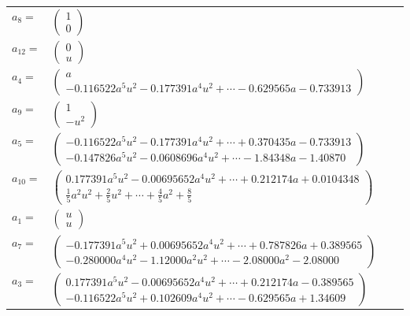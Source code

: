 \documentclass[1p]{elsarticle_modified}
\theoremstyle{definition}
\begin{document}
\begin{tabular}{m{7pt} m{180pt} m{7pt} m{180pt} }
\flushright $a_{8}=$&$\begin{pmatrix}1\\0\end{pmatrix}$ \\
\flushright $a_{12}=$&$\begin{pmatrix}0\\u\end{pmatrix}$ \\
\flushright $a_{4}=$&$\begin{pmatrix}a\\-0.116522 a^{5} u^{2}-0.177391 a^{4} u^{2}+\cdots-0.629565 a-0.733913\end{pmatrix}$ \\
\flushright $a_{9}=$&$\begin{pmatrix}1\\- u^2\end{pmatrix}$ \\
\flushright $a_{5}=$&$\begin{pmatrix}-0.116522 a^{5} u^{2}-0.177391 a^{4} u^{2}+\cdots+0.370435 a-0.733913\\-0.147826 a^{5} u^{2}-0.0608696 a^{4} u^{2}+\cdots-1.84348 a-1.40870\end{pmatrix}$ \\
\flushright $a_{10}=$&$\begin{pmatrix}0.177391 a^{5} u^{2}-0.00695652 a^{4} u^{2}+\cdots+0.212174 a+0.0104348\\\frac{1}{5} a^2 u^2+\frac{2}{5} u^2+\cdots+\frac{4}{5} a^2+\frac{8}{5}\end{pmatrix}$ \\
\flushright $a_{1}=$&$\begin{pmatrix}u\\u\end{pmatrix}$ \\
\flushright $a_{7}=$&$\begin{pmatrix}-0.177391 a^{5} u^{2}+0.00695652 a^{4} u^{2}+\cdots+0.787826 a+0.389565\\-0.280000 a^{4} u^{2}-1.12000 a^{2} u^{2}+\cdots-2.08000 a^{2}-2.08000\end{pmatrix}$ \\
\flushright $a_{3}=$&$\begin{pmatrix}0.177391 a^{5} u^{2}-0.00695652 a^{4} u^{2}+\cdots+0.212174 a-0.389565\\-0.116522 a^{5} u^{2}+0.102609 a^{4} u^{2}+\cdots-0.629565 a+1.34609\end{pmatrix}$ \\

\end{tabular}
\end{document}
